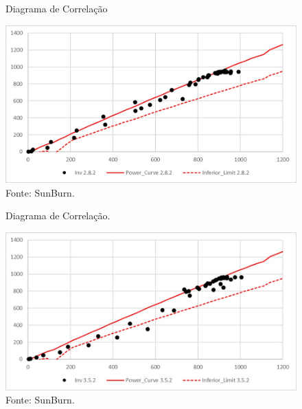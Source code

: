   
  \begin{figure}[H]
    \caption{Diagrama de Correlação} %
    \includegraphics[width=1\textwidth]{images/correlacao_1.jpeg}
    \caption*{Fonte: SunBurn.}
    \label{fig:correlacao1_aplicacao}
  \end{figure}

  
  \begin{figure}[H]
    \caption{Diagrama de Correlação.} %
    \includegraphics[width=1\textwidth]{images/correlacao_2.jpeg}
    \caption*{Fonte: SunBurn.}
    \label{fig:correlacao2_aplicacao}
  \end{figure}

